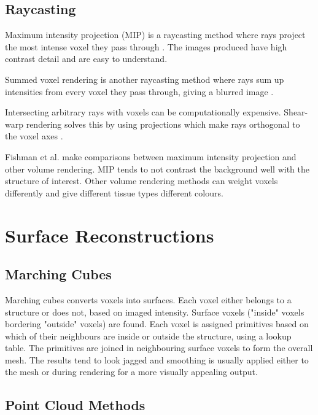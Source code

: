 \documentclass[acmsmall, 12pt]{acmart}
\begin{document}
\subsection{Raycasting}

Maximum intensity projection (MIP) is a raycasting method where rays project the most intense voxel they pass through \cite{birkfellner2016applied}. The images produced have high contrast detail and are easy to understand.

Summed voxel rendering is another raycasting method where rays sum up intensities from every voxel they pass through, giving a blurred image \cite{birkfellner2016applied}.

Intersecting arbitrary rays with voxels can be computationally expensive. Shear-warp rendering solves this by using projections which make rays orthogonal to the voxel axes \cite{lacroute1994fast}. 


Fishman et al. \cite{fishman2006volume} make comparisons between maximum intensity projection and other volume rendering. MIP tends to not contrast the background well with the structure of interest. Other volume rendering methods can weight voxels differently and give different tissue types different colours. 

\section{Surface Reconstructions}

\subsection{Marching Cubes}

Marching cubes \cite{lorensen1987marching} converts voxels into surfaces. Each voxel either belongs to a structure or does not, based on imaged intensity. Surface voxels ("inside" voxels bordering "outside" voxels) are found. Each voxel is assigned primitives based on which of their neighbours are inside or outside the structure, using a lookup table. The primitives are joined in neighbouring surface voxels to form the overall mesh. The results tend to look jagged and smoothing is usually applied either to the mesh or during rendering for a more visually appealing output.

\subsection{Point Cloud Methods}
\end{document}
